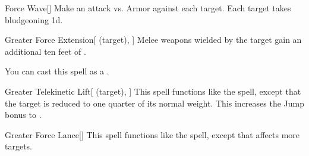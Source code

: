 \lowercase{\hypertarget{spell:Force Wave}{}}\label{spell:Force Wave}
\begin{freeability}[\nth{3}]{\hypertarget{spell:Force Wave}{Force Wave}}[]
Make an attack vs. Armor against each target.
\hit Each target takes bludgeoning  \plus1d.
\end{freeability}
\vspace{0.25em}



\lowercase{\hypertarget{spell:Greater Force Extension}{}}\label{spell:Greater Force Extension}
\begin{attuneability}[\nth{3}]{\hypertarget{spell:Greater Force Extension}{Greater Force Extension}}[ (target), ]
Melee weapons wielded by the target gain an additional ten feet of .

You can cast this spell as a .
\end{attuneability}
\vspace{0.25em}



\lowercase{\hypertarget{spell:Greater Telekinetic Lift}{}}\label{spell:Greater Telekinetic Lift}
\begin{attuneability}[\nth{3}]{\hypertarget{spell:Greater Telekinetic Lift}{Greater Telekinetic Lift}}[ (target), ]
This spell functions like the  spell, except that the target is reduced to one quarter of its normal weight.
This increases the Jump bonus to .
\end{attuneability}
\vspace{0.25em}



\lowercase{\hypertarget{spell:Greater Force Lance}{}}\label{spell:Greater Force Lance}
\begin{freeability}[\nth{4}]{\hypertarget{spell:Greater Force Lance}{Greater Force Lance}}[]
This spell functions like the  spell, except that affects more targets.
\end{freeability}
\vspace{0.25em}



